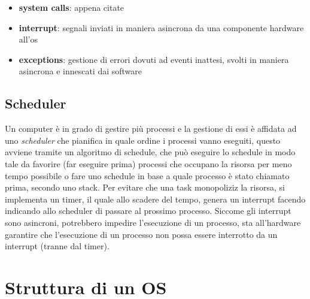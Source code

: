 \documentclass{article}
\begin{document}
        \begin{itemize}
            \item \textbf{system calls}:
                appena citate
                
            \item \textbf{interrupt}:
                segnali inviati in maniera asincrona da una componente hardware all'os

            \item \textbf{exceptions}:
                gestione di errori dovuti ad eventi inattesi, svolti in maniera asincrona e innescati dai software
        \end{itemize}
%
    \subsection{Scheduler}
        Un computer è in grado di gestire più processi e la gestione di essi è affidata ad uno \textit{scheduler} che pianifica in quale ordine i processi vanno eseguiti, questo avviene tramite un algoritmo di schedule, che può eseguire lo schedule in modo tale da favorire (far eseguire prima) processi che occupano la risorsa per meno tempo possibile o fare uno schedule in base a quale processo è stato chiamato prima, secondo uno stack.
        Per evitare che una task monopoliziz la risorsa, si implementa un timer, il quale allo scadere del tempo, genera un interrupt facendo indicando allo scheduler di passare al prossimo processo.
        Siccome gli interrupt sono asincroni, potrebbero impedire l'esecuzione di un processo, sta all'hardware garantire che l'esecuzione di un processo non possa essere interrotto da un interrupt (tranne dal timer).

\section{Struttura di un OS}
\end{document}
